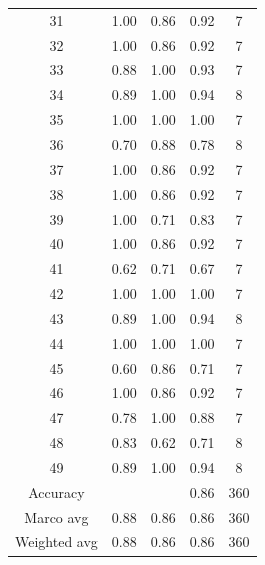\documentclass{article}
\begin{document}
\begin{sloppy}
\begin{table}[ht]
\begin{tabular}{|c|c|c|c|c|}
  31 & 1.00 & 0.86 & 0.92 & 7 \\
  32 & 1.00 & 0.86 & 0.92 & 7 \\
  33 & 0.88 & 1.00 & 0.93 & 7 \\
  34 & 0.89 & 1.00 & 0.94 & 8 \\
  35 & 1.00 & 1.00 & 1.00 & 7 \\
  36 & 0.70 & 0.88 & 0.78 & 8 \\
  37 & 1.00 & 0.86 & 0.92 & 7 \\
  38 & 1.00 & 0.86 & 0.92 & 7 \\
  39 & 1.00 & 0.71 & 0.83 & 7 \\
  40 & 1.00 & 0.86 & 0.92 & 7 \\
  41 & 0.62 & 0.71 & 0.67 & 7 \\
  42 & 1.00 & 1.00 & 1.00 & 7 \\
  43 & 0.89 & 1.00 & 0.94 & 8 \\
  44 & 1.00 & 1.00 & 1.00 & 7 \\
  45 & 0.60 & 0.86 & 0.71 & 7 \\
  46 & 1.00 & 0.86 & 0.92 & 7 \\
  47 & 0.78 & 1.00 & 0.88 & 7 \\
  48 & 0.83 & 0.62 & 0.71 & 8 \\
  49 & 0.89 & 1.00 & 0.94 & 8 \\
  \hline
  Accuracy &  &  & 0.86 & 360 \\
  Marco avg & 0.88 & 0.86 & 0.86 & 360 \\
  Weighted avg & 0.88 & 0.86 & 0.86 & 360 \\
  \hline
  \end{tabular}
\end{table}


\end{sloppy}
\end{document}
